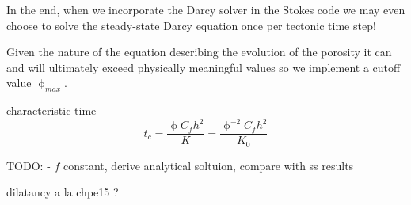 In the end, when we incorporate the Darcy solver in the Stokes code
we may even choose to solve the steady-state Darcy equation once per 
tectonic time step! 

Given the nature of the equation describing the evolution of the porosity
it can and will ultimately exceed physically meaningful values so we 
implement a cutoff value $\upphi_{max}$.


characteristic time
\[
t_c 
= \frac{\upphi C_f h^2}{K} 
= \frac{\upphi^{-2} C_f h^2}{K_0} 
\]


TODO:
- $f$ constant, derive analytical soltuion, compare with ss results


dilatancy a la chpe15 ?
